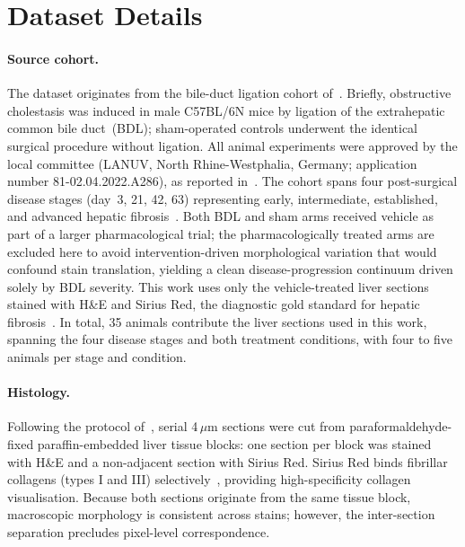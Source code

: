 
\section{Dataset Details}
\label{sec:supp-dataset}

\paragraph{Source cohort.}
\label{sec:supp-animal_model}

The dataset originates from the bile-duct ligation cohort
of~\cite{ghallab2025asbt}. Briefly, obstructive cholestasis was induced in male
C57BL/6N mice by ligation of the extrahepatic common bile duct~(BDL); sham-operated
controls underwent the identical surgical procedure without ligation. All animal
experiments were approved by the local committee (LANUV, North Rhine-Westphalia,
Germany; application number 81-02.04.2022.A286), as reported
in~\cite{ghallab2025asbt}. The cohort
spans four post-surgical disease stages (day~3, 21, 42, 63) representing early,
intermediate, established, and advanced hepatic fibrosis~\cite{bataller2005liver}.
Both BDL and sham arms received vehicle as part of a larger pharmacological trial;
the pharmacologically treated arms are excluded here to avoid intervention-driven
morphological variation that would confound stain translation, yielding a clean
disease-progression continuum driven solely by BDL severity.
This work uses only the vehicle-treated liver sections stained with H\&E and
Sirius Red, the diagnostic gold standard for hepatic
fibrosis~\cite{huang2013sirius}.
In total, 35 animals contribute the liver sections used in this work, spanning the
four disease stages and both treatment conditions, with four to five animals per
stage and condition.

\paragraph{Histology.}
\label{sec:supp-staining}

Following the protocol of~\cite{ghallab2025asbt}, serial 4\,$\mu$m sections were
cut from paraformaldehyde-fixed paraffin-embedded liver tissue blocks: one section
per block was stained with H\&E and a non-adjacent section with Sirius Red.
Sirius Red binds fibrillar collagens (types I and III)
selectively~\cite{constantine1969}, providing high-specificity collagen
visualisation. Because both sections originate from the same tissue block,
macroscopic morphology is consistent across stains; however, the inter-section
separation precludes pixel-level correspondence.

